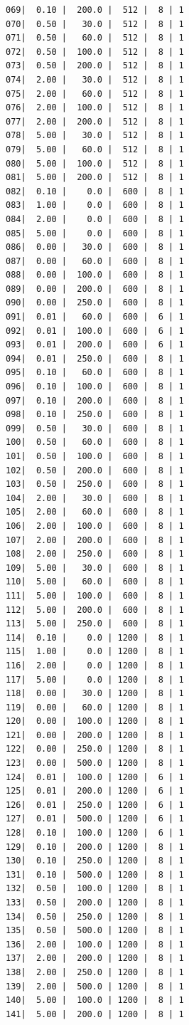 \documentclass[letterpaper, oneside, 12pt]{article}
\begin{document}
\begin{verbatim}
069|  0.10 |  200.0 |  512 |  8 | 1
070|  0.50 |   30.0 |  512 |  8 | 1
071|  0.50 |   60.0 |  512 |  8 | 1
072|  0.50 |  100.0 |  512 |  8 | 1
073|  0.50 |  200.0 |  512 |  8 | 1
074|  2.00 |   30.0 |  512 |  8 | 1
075|  2.00 |   60.0 |  512 |  8 | 1
076|  2.00 |  100.0 |  512 |  8 | 1
077|  2.00 |  200.0 |  512 |  8 | 1
078|  5.00 |   30.0 |  512 |  8 | 1
079|  5.00 |   60.0 |  512 |  8 | 1
080|  5.00 |  100.0 |  512 |  8 | 1
081|  5.00 |  200.0 |  512 |  8 | 1
082|  0.10 |    0.0 |  600 |  8 | 1
083|  1.00 |    0.0 |  600 |  8 | 1
084|  2.00 |    0.0 |  600 |  8 | 1
085|  5.00 |    0.0 |  600 |  8 | 1
086|  0.00 |   30.0 |  600 |  8 | 1
087|  0.00 |   60.0 |  600 |  8 | 1
088|  0.00 |  100.0 |  600 |  8 | 1
089|  0.00 |  200.0 |  600 |  8 | 1
090|  0.00 |  250.0 |  600 |  8 | 1
091|  0.01 |   60.0 |  600 |  6 | 1
092|  0.01 |  100.0 |  600 |  6 | 1
093|  0.01 |  200.0 |  600 |  6 | 1
094|  0.01 |  250.0 |  600 |  8 | 1
095|  0.10 |   60.0 |  600 |  8 | 1
096|  0.10 |  100.0 |  600 |  8 | 1
097|  0.10 |  200.0 |  600 |  8 | 1
098|  0.10 |  250.0 |  600 |  8 | 1
099|  0.50 |   30.0 |  600 |  8 | 1
100|  0.50 |   60.0 |  600 |  8 | 1
101|  0.50 |  100.0 |  600 |  8 | 1
102|  0.50 |  200.0 |  600 |  8 | 1
103|  0.50 |  250.0 |  600 |  8 | 1
104|  2.00 |   30.0 |  600 |  8 | 1
105|  2.00 |   60.0 |  600 |  8 | 1
106|  2.00 |  100.0 |  600 |  8 | 1
107|  2.00 |  200.0 |  600 |  8 | 1
108|  2.00 |  250.0 |  600 |  8 | 1
109|  5.00 |   30.0 |  600 |  8 | 1
110|  5.00 |   60.0 |  600 |  8 | 1
111|  5.00 |  100.0 |  600 |  8 | 1
112|  5.00 |  200.0 |  600 |  8 | 1
113|  5.00 |  250.0 |  600 |  8 | 1
114|  0.10 |    0.0 | 1200 |  8 | 1
115|  1.00 |    0.0 | 1200 |  8 | 1
116|  2.00 |    0.0 | 1200 |  8 | 1
117|  5.00 |    0.0 | 1200 |  8 | 1
118|  0.00 |   30.0 | 1200 |  8 | 1
119|  0.00 |   60.0 | 1200 |  8 | 1
120|  0.00 |  100.0 | 1200 |  8 | 1
121|  0.00 |  200.0 | 1200 |  8 | 1
122|  0.00 |  250.0 | 1200 |  8 | 1
123|  0.00 |  500.0 | 1200 |  8 | 1
124|  0.01 |  100.0 | 1200 |  6 | 1
125|  0.01 |  200.0 | 1200 |  6 | 1
126|  0.01 |  250.0 | 1200 |  6 | 1
127|  0.01 |  500.0 | 1200 |  6 | 1
128|  0.10 |  100.0 | 1200 |  6 | 1
129|  0.10 |  200.0 | 1200 |  8 | 1
130|  0.10 |  250.0 | 1200 |  8 | 1
131|  0.10 |  500.0 | 1200 |  8 | 1
132|  0.50 |  100.0 | 1200 |  8 | 1
133|  0.50 |  200.0 | 1200 |  8 | 1
134|  0.50 |  250.0 | 1200 |  8 | 1
135|  0.50 |  500.0 | 1200 |  8 | 1
136|  2.00 |  100.0 | 1200 |  8 | 1
137|  2.00 |  200.0 | 1200 |  8 | 1
138|  2.00 |  250.0 | 1200 |  8 | 1
139|  2.00 |  500.0 | 1200 |  8 | 1
140|  5.00 |  100.0 | 1200 |  8 | 1
141|  5.00 |  200.0 | 1200 |  8 | 1

\end{verbatim}
\end{document}

